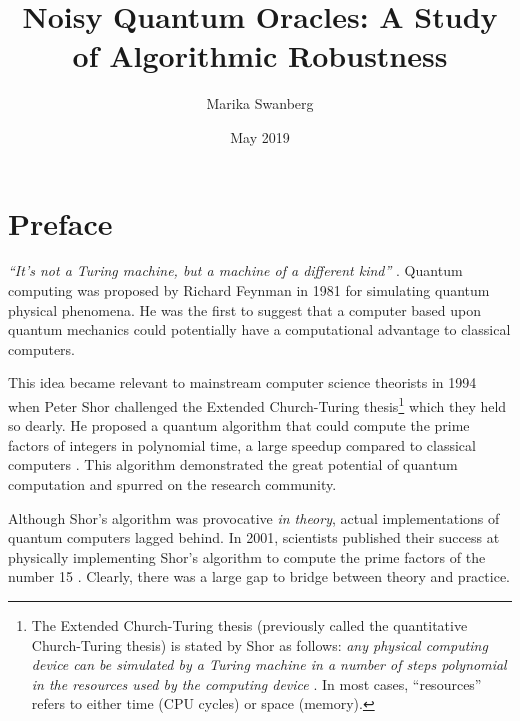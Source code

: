 \documentclass[12pt,twoside]{reedthesis}
\title{Noisy Quantum Oracles: A Study of Algorithmic Robustness}
\author{Marika Swanberg}
\date{May 2019}
\theoremstyle{definition}
\begin{document}
  \maketitle
  \frontmatter %
  \pagestyle{empty} %


	

   \chapter*{Preface}
   \emph{``It's not a Turing machine, but a machine of a different kind''} \citep{feynman1982simulating}. Quantum computing was proposed by Richard Feynman in 1981 for simulating quantum physical phenomena. He was the first to suggest that a computer based upon quantum mechanics could potentially have a computational advantage to classical computers. 

This idea became relevant to mainstream computer science theorists in 1994 when Peter Shor challenged the Extended Church-Turing thesis\footnote{The Extended Church-Turing thesis (previously called the quantitative Church-Turing thesis) is stated by Shor as follows: \emph{any physical computing device can be simulated by a Turing machine in a number of steps polynomial in the resources used by the computing device }\citep{shor1999polynomial}. In most cases, ``resources'' refers to either time (CPU cycles) or space (memory).} which they held so dearly. He proposed a quantum algorithm that could compute the prime factors of integers in polynomial time, a large speedup compared to classical computers \citep{shor1999polynomial}. This algorithm demonstrated the great potential of quantum computation and spurred on the research community.

Although Shor's algorithm was provocative \emph{in theory}, actual implementations of quantum computers lagged behind. In 2001, scientists published their success at physically implementing Shor's algorithm to compute the prime factors of the number 15  \citep{experimentalshor2001}. Clearly, there was a large gap to bridge between theory and practice. 
\end{document}
